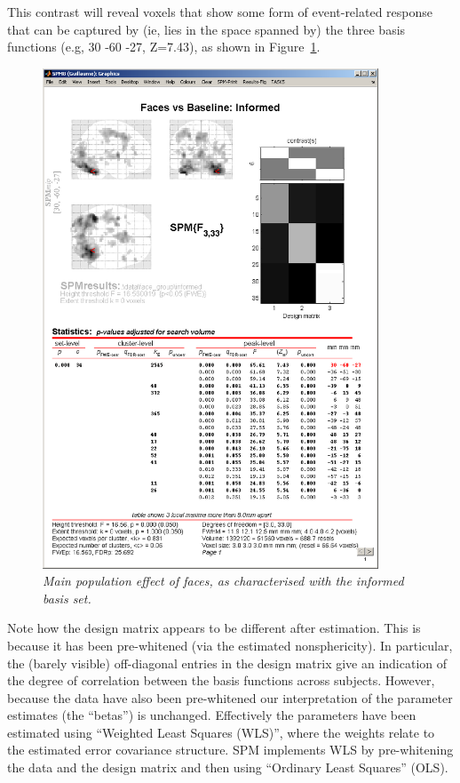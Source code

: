 This contrast will reveal voxels that show some form of event-related response that can be captured by (ie, lies in the space spanned by) the three basis functions (e.g, 30 -60 -27, Z=7.43), as shown in Figure~\ref{informed_results}.
\begin{figure}
\begin{center}
\includegraphics[width=100mm]{faces_group/informed_results}
\caption{\em Main population effect of faces, as characterised with the informed basis set. \label{informed_results}}
\end{center}
\end{figure}

Note how the design matrix appears to be different after estimation. This is because it has been pre-whitened (via the estimated nonsphericity). In particular, the (barely visible) off-diagonal entries in the design matrix give an indication of the degree of correlation between the basis functions across subjects. However, because the data have also been pre-whitened our interpretation of the parameter estimates (the ``betas'') is unchanged. Effectively the parameters have been estimated using ``Weighted Least Squares (WLS)'', where the weights relate to the estimated error covariance structure. SPM implements WLS by pre-whitening the data and the design matrix and then using ``Ordinary Least Squares'' (OLS).


